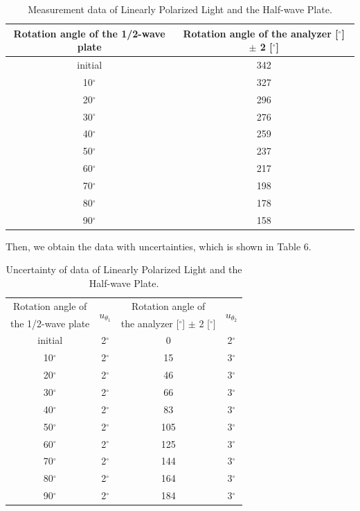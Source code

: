 \documentclass[a4paper,12pt]{article}
\begin{document}
\begin{table}[h]
\begin{center}
\begin{tabular}{|c|c|}
\hline
Rotation angle of the 1/2-wave plate & Rotation angle of the analyzer [$^{\circ}$] $\pm$ 2 [$^{\circ}$] \\
\hline 
initial & 342 \\
\hline 
10$^{\circ}$ & 327 \\
\hline
20$^{\circ}$ & 296 \\
\hline
30$^{\circ}$ & 276 \\
\hline
40$^{\circ}$ & 259 \\
\hline
50$^{\circ}$ & 237 \\
\hline
60$^{\circ}$ & 217 \\
\hline
70$^{\circ}$ & 198 \\
\hline
80$^{\circ}$ & 178 \\
\hline
90$^{\circ}$ & 158 \\
\hline
\end{tabular}
\caption{Measurement data of Linearly Polarized Light and the Half-wave Plate.}
\end{center}
\end{table}

Then, we obtain the data with uncertainties, which is shown in Table 6.

\begin{table}[h]
\begin{center}
\begin{tabular}{|c|c|c|c|}
\hline
Rotation angle of & \multirow{2}{1cm}{$u_{\theta_1}$} & Rotation angle of & \multirow{2}{1cm}{$u_{\theta_2}$} \\ the 1/2-wave plate&  & the analyzer [$^{\circ}$] $\pm$ 2 [$^{\circ}$] & \\
\hline 
initial & 2$^{\circ}$ & 0 & 2$^{\circ}$\\
\hline 
10$^{\circ}$ & 2$^{\circ}$ & 15 & 3$^{\circ}$\\
\hline
20$^{\circ}$ & 2$^{\circ}$ & 46 & 3$^{\circ}$\\
\hline
30$^{\circ}$ & 2$^{\circ}$ & 66 & 3$^{\circ}$\\
\hline
40$^{\circ}$ & 2$^{\circ}$ & 83 & 3$^{\circ}$\\
\hline
50$^{\circ}$ & 2$^{\circ}$ & 105 & 3$^{\circ}$\\
\hline
60$^{\circ}$ & 2$^{\circ}$ & 125 & 3$^{\circ}$\\
\hline
70$^{\circ}$ & 2$^{\circ}$ & 144 & 3$^{\circ}$\\
\hline
80$^{\circ}$ & 2$^{\circ}$ & 164 & 3$^{\circ}$\\
\hline
90$^{\circ}$ & 2$^{\circ}$ & 184 & 3$^{\circ}$\\
\hline
\end{tabular}
\caption{Uncertainty of data of Linearly Polarized Light and the Half-wave Plate.}
\end{center}
\end{table}
\end{document}
